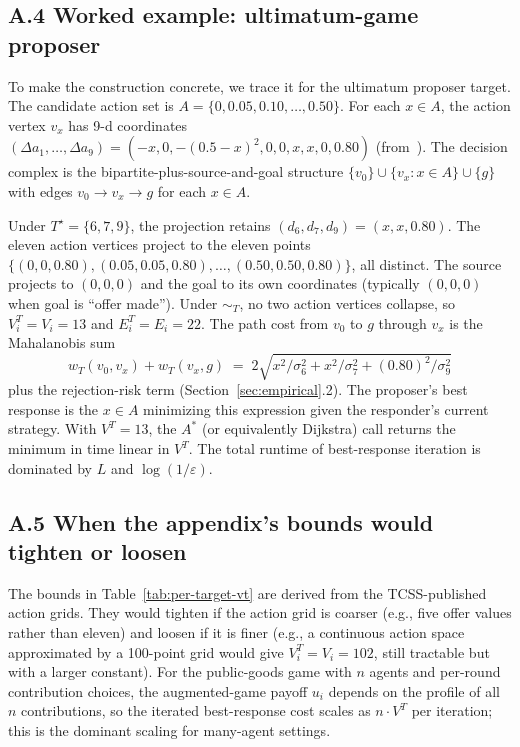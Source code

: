 \documentclass[11pt]{article}
\theoremstyle{definition}
\theoremstyle{remark}
\begin{document}
\subsection*{A.4 Worked example: ultimatum-game proposer}

To make the construction concrete, we trace it for the ultimatum proposer target. The candidate
action set is $A = \{0, 0.05, 0.10, \ldots, 0.50\}$. For each $x \in A$, the action vertex $v_x$ has
9-d coordinates $(\Delta a_1, \ldots, \Delta a_9) = (-x, 0, -(0.5-x)^2, 0, 0, x, x, 0, 0.80)$
(from~\cite[\S IV.A]{bond2026tcss}). The decision complex is the bipartite-plus-source-and-goal
structure $\{v_0\} \cup \{v_x : x \in A\} \cup \{g\}$ with edges $v_0 \to v_x \to g$ for each
$x \in A$.

Under $T^\star = \{6, 7, 9\}$, the projection retains $(d_6, d_7, d_9) = (x, x, 0.80)$. The eleven
action vertices project to the eleven points $\{(0, 0, 0.80), (0.05, 0.05, 0.80), \ldots,
(0.50, 0.50, 0.80)\}$, all distinct. The source projects to $(0, 0, 0)$ and the goal to its own
coordinates (typically $(0, 0, 0)$ when goal is ``offer made''). Under $\sim_T$, no two action
vertices collapse, so $V_i^T = V_i = 13$ and $E_i^T = E_i = 22$. The path cost from $v_0$ to $g$
through $v_x$ is the Mahalanobis sum
\[
w_T(v_0, v_x) + w_T(v_x, g)
\;=\;
2\sqrt{x^2/\sigma_6^2 + x^2/\sigma_7^2 + (0.80)^2/\sigma_9^2}
\]
plus the rejection-risk term (Section~\ref{sec:empirical}.2). The proposer's best response is the
$x \in A$ minimizing this expression given the responder's current strategy. With $V^T = 13$, the
$A^*$ (or equivalently Dijkstra) call returns the minimum in time linear in $V^T$. The total
runtime of best-response iteration is dominated by $L$ and $\log(1/\varepsilon)$.

\subsection*{A.5 When the appendix's bounds would tighten or loosen}

The bounds in Table~\ref{tab:per-target-vt} are derived from the TCSS-published action grids. They
would tighten if the action grid is coarser (e.g., five offer values rather than eleven) and loosen
if it is finer (e.g., a continuous action space approximated by a 100-point grid would give
$V_i^T = V_i = 102$, still tractable but with a larger constant). For the public-goods game with
$n$ agents and per-round contribution choices, the augmented-game payoff $u_i$ depends on the
profile of all $n$ contributions, so the iterated best-response cost scales as $n \cdot V^T$ per
iteration; this is the dominant scaling for many-agent settings.
\end{document}
